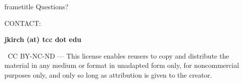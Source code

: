 \documentclass[aspectratio=169,12pt]{beamer}
\begin{document}
\begin{frame}[plain]
\vspace{3cm}
\begin{beamercolorbox}[wd=\paperwidth,ht=2.5cm,dp=0.8cm]{frametitle}
  \hfill{\Huge Questions?}\hspace{1cm}
  \vspace{0.5cm}

  \hfill{\small CONTACT:}\hspace{1cm}

  \hfill{\large\textbf{jkirch (at) tcc dot edu}}\hspace{1cm}
\end{beamercolorbox}
\vfill
\begin{center}
{\tiny\textcopyright\ CC BY-NC-ND --- This license enables reusers to copy and distribute the material in any medium or format in unadapted form only, for noncommercial purposes only, and only so long as attribution is given to the creator.}
\end{center}
\end{frame}
\end{document}
